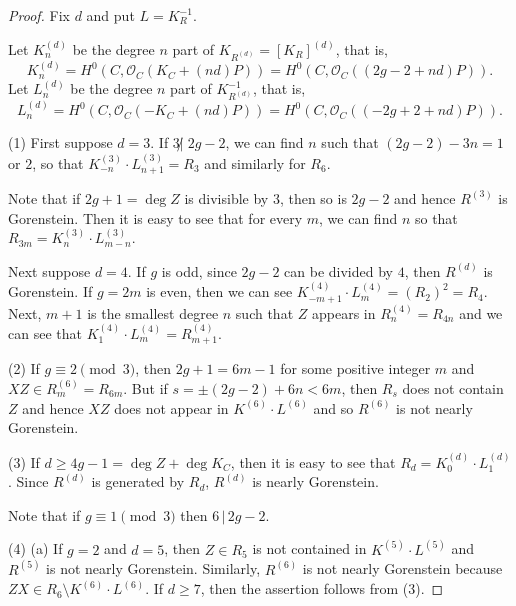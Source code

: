 \documentclass[10pt,a4paper]{amsart}
\newcommand{\cO}{\mathcal O}
\begin{document}
\begin{proof} 
Fix $d$ and put $L=K_R^{-1}$. 
\par
Let $K^{(d)}_n$ be the degree $n$ part of 
$K_{R^{(d)}}= [K_R]^{(d)}$, that is, 
\[
K^{(d)}_n=H^0(C, \cO_C(K_C + (nd)P)) = 
H^0(C, \cO_C((2g-2+ nd)P)). 
\]
Let  $L^{(d)}_n$  be the degree $n$ part of 
$K^{-1}_{R^{(d)}}$, that is, 
\[
L^{(d)}_n=H^0(C, \cO_C(-K_C + (nd)P)) = 
H^0(C, \cO_C((-2g+2+ nd)P)). 
\]

\par
(1) First suppose $d=3$. 
If $3 \not | \; 2g-2$, we can find $n$ such that $(2g-2) - 3n = 1$ or $2$, so that
$ K^{(3)}_{-n} \cdot L^{(3)}_{n+1} = R_3$ and similarly for $R_6$. 
\par
Note that if  $2g+1 = \deg Z$ is divisible by $3$, then so is $2g-2$ and hence 
$R^{(3)}$ is Gorenstein. Then it is easy to see that for every $m$, 
we can find $n$ so that $R_{3m} = K^{(3)}_n\cdot  L^{(3)}_{m-n}$. 
\par \vspace{1mm}
Next suppose $d=4$. If $g$ is odd, since $2g-2$ can be 
divided by $4$, then $R^{(d)}$ is Gorenstein. 
If $g=2m$ is even, then we can see $K^{(4)}_{-m+1}\cdot L^{(4)}_{m} = (R_2)^2 =R_4$.
Next, $m+1$ is the smallest degree $n$ such that $Z$ appears in 
$ R^{(4)}_{n} = R_{4n}$ and 
we can see that $K^{(4)}_{1}\cdot L^{(4)}_{m}= R^{(4)}_{m+1}$.  

\par \vspace{1mm}
(2) If $g \equiv 2 \pmod{3}$, then $2g + 1 = 6m -1$ for some positive integer $m$ 
and $XZ \in R^{(6)}_m = R_{6m}$.  But if $s= \pm (2g-2) + 6n < 6m$, then $R_s$ does not 
contain $Z$ and hence $XZ$ does not appear in $K^{(6)} \cdot  L^{(6)}$ and so $R^{(6)}$ is not nearly Gorenstein.  

\par \vspace{1mm}
(3) If $d \ge 4g-1 = \deg Z + \deg K_C$, then it is easy to see that 
$R_d = K^{(d)}_{0}\cdot L^{(d)}_{1}$. Since   $R^{(d)}$ is generated by $R_d$, 
$R^{(d)}$ is nearly Gorenstein.  
\par 
Note that if $g \equiv 1 \pmod{3}$ then $6 \,|\, 2g-2$.  
\par \vspace{1mm}
(4) (a) If $g =2$ and $d=5$, then $Z \in R_5$ is not contained in 
$K^{(5)} \cdot  L^{(5)}$
and $R^{(5)}$ is not nearly Gorenstein. 
Similarly, $R^{(6)}$ is not nearly Gorenstein because 
$ZX \in R_6 \setminus  K^{(6)} \cdot  L^{(6)}$. 
If $d\ge 7$,  then the assertion follows from (3). 


\end{proof}
\end{document}

